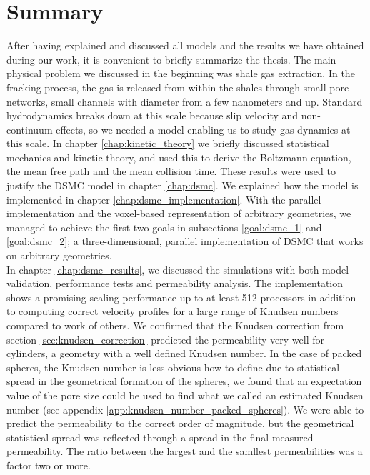 \section{Summary}
After having explained and discussed all models and the results we have obtained during our work, it is convenient to briefly summarize the thesis. The main physical problem we discussed in the beginning was shale gas extraction. In the fracking process, the gas is released from within the shales through small pore networks, small channels with diameter from a few nanometers and up. Standard hydrodynamics breaks down at this scale because slip velocity and non-continuum effects, so we needed a model enabling us to study gas dynamics at this scale. In chapter \ref{chap:kinetic_theory} we briefly discussed statistical mechanics and kinetic theory, and used this to derive the Boltzmann equation, the mean free path and the mean collision time. These results were used to justify the DSMC model in chapter \ref{chap:dsmc}. We explained how the model is implemented in chapter \ref{chap:dsmc_implementation}. With the parallel implementation and the voxel-based representation of arbitrary geometries, we managed to achieve the first two goals in subsections \ref{goal:dsmc_1} and \ref{goal:dsmc_2}; a three-dimensional, parallel implementation of DSMC that works on arbitrary geometries. \\
In chapter \ref{chap:dsmc_results}, we discussed the simulations with both model validation, performance tests and permeability analysis. The implementation shows a promising scaling performance up to at least 512 processors in addition to computing correct velocity profiles for a large range of Knudsen numbers compared to work of others. We confirmed that the Knudsen correction from section \ref{sec:knudsen_correction} predicted the permeability very well for cylinders, a geometry with a well defined Knudsen number. In the case of packed spheres, the Knudsen number is less obvious how to define due to statistical spread in the geometrical formation of the spheres, we found that an expectation value of the pore size could be used to find what we called an estimated Knudsen number (see appendix \ref{app:knudsen_number_packed_spheres}). We were able to predict the permeability to the correct order of magnitude, but the geometrical statistical spread was reflected through a spread in the final measured permeability. The ratio between the largest and the samllest permeabilities was a factor two or more.\\
